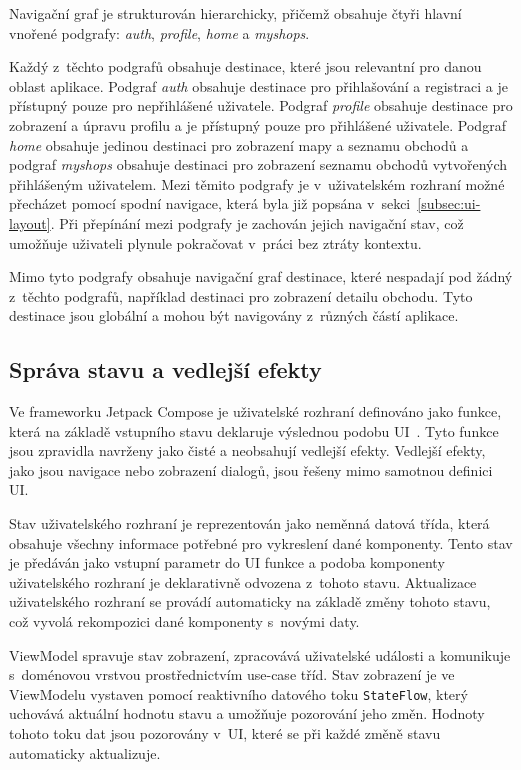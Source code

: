 Navigační graf je strukturován hierarchicky, přičemž obsahuje čtyři hlavní vnořené podgrafy: \textit{auth}, \textit{profile}, \textit{home} a \textit{my\-shops}.

Každý z~těchto podgrafů obsahuje destinace, které jsou relevantní pro danou oblast aplikace.
Podgraf \textit{auth} obsahuje destinace pro přihlašování a registraci a je přístupný pouze pro nepřihlášené uživatele.
Podgraf \textit{profile} obsahuje destinace pro zobrazení a úpravu profilu a je přístupný pouze pro přihlášené uživatele.
Podgraf \textit{home} obsahuje jedinou destinaci pro zobrazení mapy a seznamu obchodů a podgraf \textit{my\-shops} obsahuje destinaci pro zobrazení seznamu obchodů vytvořených přihlášeným uživatelem.
Mezi těmito podgrafy je v~uživatelském rozhraní možné přecházet pomocí spodní navigace, která byla již popsána v~sekci~\ref{subsec:ui-layout}.
Při přepínání mezi podgrafy je zachován jejich navigační stav, což umožňuje uživateli plynule pokračovat v~práci bez ztráty kontextu.

Mimo tyto podgrafy obsahuje navigační graf destinace, které nespadají pod žádný z~těchto podgrafů, například destinaci pro zobrazení detailu obchodu.
Tyto destinace jsou globální a mohou být navigovány z~různých částí aplikace.

\subsection{Správa stavu a vedlejší efekty}\label{subsec:ui-state-management}
Ve frameworku Jetpack Compose je uživatelské rozhraní definováno jako funkce, která na základě vstupního stavu deklaruje výslednou podobu UI~\parencite{compose_mental_model}.
Tyto funkce jsou zpravidla navrženy jako čisté a neobsahují vedlejší efekty.
Vedlejší efekty, jako jsou navigace nebo zobrazení dialogů, jsou řešeny mimo samotnou definici UI.

Stav uživatelského rozhraní je reprezentován jako neměnná datová třída, která obsahuje všechny informace potřebné pro vykreslení dané komponenty.
Tento stav je předáván jako vstupní parametr do UI funkce a podoba komponenty uživatelského rozhraní je deklarativně odvozena z~tohoto stavu.
Aktualizace uživatelského rozhraní se provádí automaticky na základě změny tohoto stavu, což vyvolá rekompozici dané komponenty s~novými daty.

ViewModel spravuje stav zobrazení, zpracovává uživatelské události a komunikuje s~doménovou vrstvou prostřednictvím use-case tříd.
Stav zobrazení je ve ViewModelu vystaven pomocí reaktivního datového toku \texttt{State\-Flow}, který uchovává aktuální hodnotu stavu a umožňuje pozorování jeho změn.
Hodnoty tohoto toku dat jsou pozorovány v~UI, které se při každé změně stavu automaticky aktualizuje.

